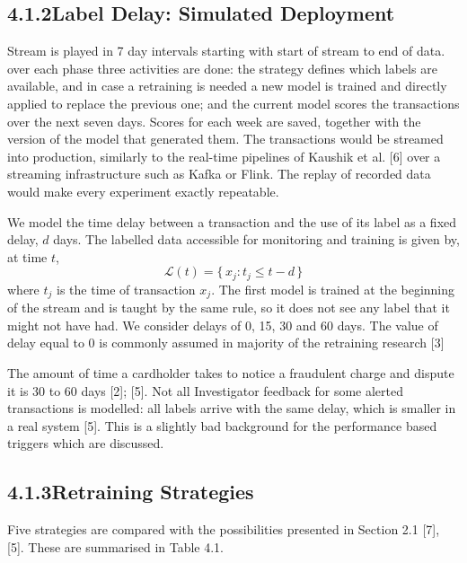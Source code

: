 \documentclass[11pt,letterpaper]{report}
\begin{document}
\subsection*{4.1.2\quad Label Delay: Simulated Deployment}

Stream is played in 7 day intervals starting with start of stream to end of data. over each phase three activities are done: the strategy defines which labels are available, and in case a retraining is needed a new model is trained and directly applied to replace the previous one; and the current model scores the transactions over the next seven days. Scores for each week are saved, together with the version of the model that generated them. The transactions would be streamed into production, similarly to the real-time pipelines of Kaushik et al. [6] over a streaming infrastructure such as Kafka or Flink. The replay of recorded data would make every experiment exactly repeatable.

We model the time delay between a transaction and the use of its label as a fixed delay, $d$ days. The labelled data accessible for monitoring and training is given by, at time $t$,
\begin{equation*}
  \mathcal{L}(t) = \{\, x_j : t_j \le t - d \,\} \tag{4.1}
\end{equation*}
where $t_j$ is the time of transaction $x_j$. The first model is trained at the beginning of the stream and is taught by the same rule, so it does not see any label that it might not have had. We consider delays of 0, 15, 30 and 60 days. The value of delay equal to 0 is commonly assumed in majority of the retraining research [3]

The amount of time a cardholder takes to notice a fraudulent charge and dispute it is 30 to 60 days [2]; [5]. Not all Investigator feedback for some alerted transactions is modelled: all labels arrive with the same delay, which is smaller in a real system [5]. This is a slightly bad background for the performance based triggers which are discussed.

\subsection*{4.1.3\quad Retraining Strategies}

Five strategies are compared with the possibilities presented in Section 2.1 [7], [5]. These are summarised in Table 4.1.
\end{document}
